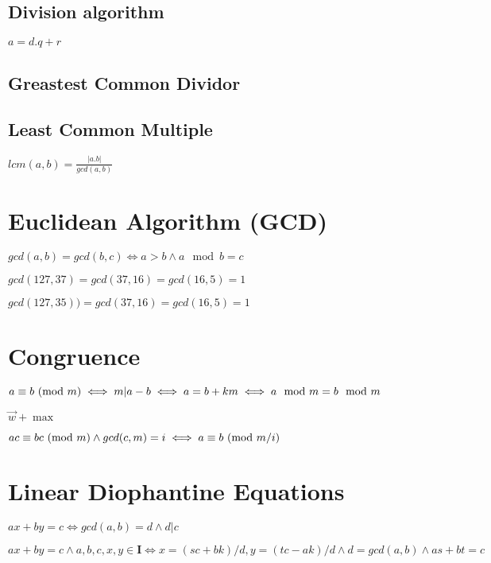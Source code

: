 \documentclass{article}
\begin{document}
\subsection{Division algorithm}

$a = d.q + r$

\subsection{Greastest Common Dividor}
\subsection{Least Common Multiple}

$lcm(a,b) = \frac{|a.b|}{gcd(a,b)}$

\section{Euclidean Algorithm (GCD)}

$gcd(a,b) = gcd(b,c) \iff a > b \wedge a \mod b = c$

$gcd(127, 37) = gcd(37, 16) = gcd(16, 5) = 1$

$gcd(127, 35)) = gcd(37, 16) = gcd(16, 5) = 1$


\section{Congruence}

$a \equiv b\ (\text{mod}\ m) \iff m | a-b \iff a = b + km \iff a\mod m = b\mod m$

$\overrightarrow{w} + \max  $

$ac \equiv bc\ (\text{mod}\ m) \wedge gcd(c,m) = i \iff a \equiv b\ (\text{mod}\ m/i)$

\section{Linear Diophantine Equations}

$ax + by = c \iff gcd(a,b) = d \wedge d|c$

$ax + by = c \wedge a,b,c,x,y \in \mathbf{I} \iff x = (sc + bk)/d, y = (tc - ak)/d \wedge d = gcd(a,b) \wedge as + bt = c$
\end{document}
